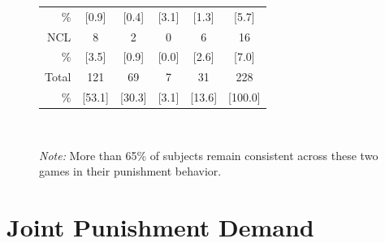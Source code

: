 \documentclass[11pt,a4paper]{article}
\newcommand{\fns}{\footnotesize}
\newcommand{\nc}{\cellcolor{black!5}}
\begin{document}
\begin{refsection}
\begin{figure}[tbp]
{{\begin{tabular}[h]{r|cccc|c}
\fns\%    & \fns [0.9]              & \fns [0.4]      & \nc \fns [3.1]          & \fns [1.3]     & \fns [5.7]   \\
NCL       & 8                       & 2               & \color{gray} 0          & 6          & 16           \\
\fns\%    & \fns [3.5]              & \fns [0.9]      & \fns \color{gray} [0.0] & \fns [2.6] & \fns [7.0]   \\
\midrule
Total     & 121                     & 69              & 7                       & 31             & 228          \\
\fns\%    & \fns [53.1]             & \fns [30.3]     & \fns [3.1]              & \fns [13.6]    & \fns [100.0] \\
 \bottomrule 
  \end{tabular}
  }
}
  \label{fig:punXtab}
  \smallskip                                                                                                    \\
  \parbox{\linewidth}{\footnotesize\textit{Note:} More than 65\% of subjects
    remain consistent across these two games in their punishment behavior.}
\end{figure}

\section{Joint Punishment Demand}


\end{refsection}
\end{document}
